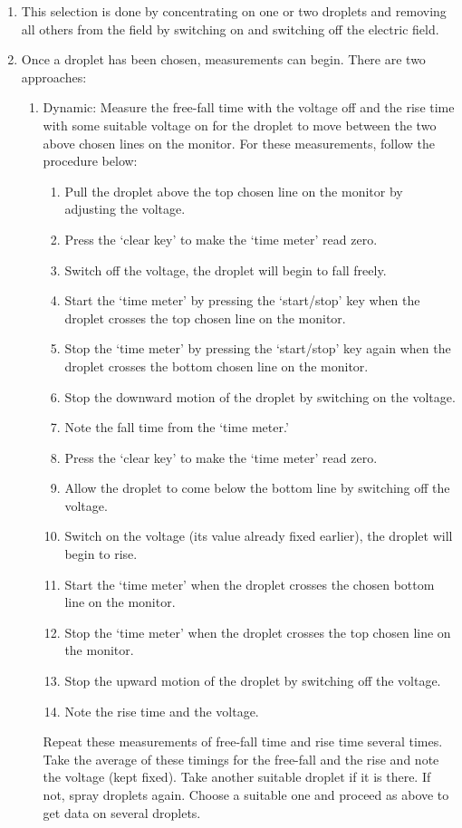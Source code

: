 \documentclass[%
sor,
 jor,
 amsmath,amssymb,
 reprint,%
]{revtex4-2}
\begin{document}
\begin{enumerate}
    \item This selection is done by concentrating on one or two droplets and removing all others from the field by switching on and switching off the electric field.
    \item Once a droplet has been chosen, measurements can begin. There are two approaches:
    \begin{enumerate}
        \item {Dynamic:} Measure the free-fall time with the voltage off and the rise time with some suitable voltage on for the droplet to move between the two above chosen lines on the monitor. For these measurements, follow the procedure below:
        \begin{enumerate}
            \item Pull the droplet above the top chosen line on the monitor by adjusting the voltage.
            \item Press the ‘clear key’ to make the ‘time meter’ read zero.
            \item Switch off the voltage, the droplet will begin to fall freely.
            \item Start the ‘time meter’ by pressing the ‘start/stop’ key when the droplet crosses the top chosen line on the monitor.
            \item Stop the ‘time meter’ by pressing the ‘start/stop’ key again when the droplet crosses the bottom chosen line on the monitor.
            \item Stop the downward motion of the droplet by switching on the voltage.
            \item Note the fall time from the ‘time meter.’
            \item Press the ‘clear key’ to make the ‘time meter’ read zero.
            \item Allow the droplet to come below the bottom line by switching off the voltage.
            \item Switch on the voltage (its value already fixed earlier), the droplet will begin to rise.
            \item Start the ‘time meter’ when the droplet crosses the chosen bottom line on the monitor.
            \item Stop the ‘time meter’ when the droplet crosses the top chosen line on the monitor.
            \item Stop the upward motion of the droplet by switching off the voltage.
            \item Note the rise time and the voltage.
        \end{enumerate}
        Repeat these measurements of free-fall time and rise time several times. Take the {average} of these timings for the free-fall and the rise and note the voltage (kept fixed). Take another suitable droplet if it is there. If not, spray droplets again. Choose a suitable one and proceed as above to get data on several droplets.
        

\end{enumerate}
\end{enumerate}
\end{document}
